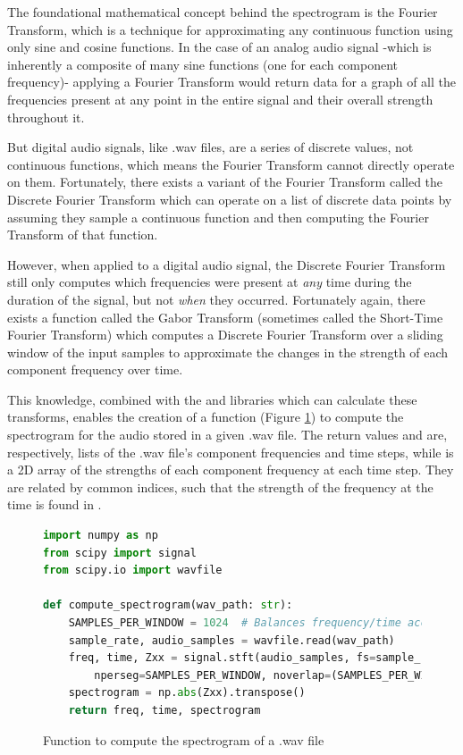 The foundational mathematical concept behind the spectrogram is the Fourier Transform, which is a technique for approximating any continuous function using only sine and cosine functions.
In the case of an analog audio signal -which is inherently a composite of many sine functions (one for each component frequency)- applying a Fourier Transform would return data for a graph of all the frequencies present at any point in the entire signal and their overall strength throughout it.

But digital audio signals, like .wav files, are a series of discrete values, not continuous functions, which means the Fourier Transform cannot directly operate on them.
Fortunately, there exists a variant of the Fourier Transform called the Discrete Fourier Transform which can operate on a list of discrete data points by assuming they sample a continuous function and then computing the Fourier Transform of that function.

However, when applied to a digital audio signal, the Discrete Fourier Transform still only computes which frequencies were present at \emph{any} time during the duration of the signal, but not \emph{when} they occurred. 
Fortunately again, there exists a function called the Gabor Transform (sometimes called the Short-Time Fourier Transform) which computes a Discrete Fourier Transform over a sliding window of the input samples to approximate the changes in the strength of each component frequency over time.

This knowledge, combined with the  \cite{numpy} and  \cite{scipy} libraries which can calculate these transforms, enables the creation of a function (Figure \ref{fig:code-compute-spectrogram}) to compute the spectrogram for the audio stored in a given .wav file.
The return values  and  are, respectively, lists of the .wav file's component frequencies and time steps, while  is a 2D array of the strengths of each component frequency at each time step.
They are related by common indices, such that the strength of the frequency  at the time  is found in .

\begin{figure}[h]
\caption{Function to compute the spectrogram of a .wav file}
\label{fig:code-compute-spectrogram}
\begin{lstlisting}[language=Python]
import numpy as np
from scipy import signal
from scipy.io import wavfile

def compute_spectrogram(wav_path: str):
    SAMPLES_PER_WINDOW = 1024  # Balances frequency/time accuracy
    sample_rate, audio_samples = wavfile.read(wav_path)
    freq, time, Zxx = signal.stft(audio_samples, fs=sample_rate,
        nperseg=SAMPLES_PER_WINDOW, noverlap=(SAMPLES_PER_WINDOW // 4) * 3)
    spectrogram = np.abs(Zxx).transpose()
    return freq, time, spectrogram
\end{lstlisting}
\end{figure}

